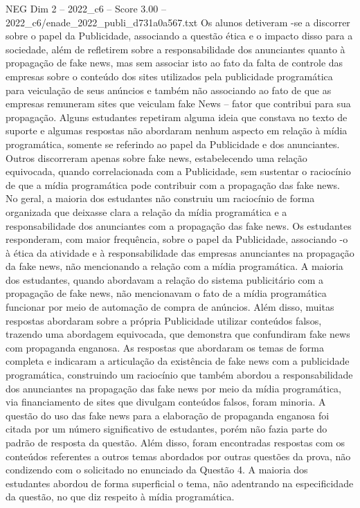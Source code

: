 \begin{textsample}{NEG Dim 2 – 2022\_c6 – Score 3.00 – 2022\_c6/enade\_2022\_publi\_d731a0a567.txt}
Os alunos detiveram -se a discorrer sobre o papel da Publicidade, associando a questão ética e o impacto disso para a sociedade, além de refletirem sobre a responsabilidade dos anunciantes quanto à propagação de fake news, mas sem associar isto ao fato da falta de controle das empresas sobre o conteúdo dos sites utilizados pela publicidade programática para veiculação de seus anúncios e também não associando ao fato de que as empresas remuneram sites que veiculam fake News – fator que contribui para sua propagação.
Alguns estudantes repetiram alguma ideia que constava no texto de suporte e algumas respostas não abordaram nenhum aspecto em relação à mídia programática, somente se referindo ao papel da Publicidade e dos anunciantes.
Outros discorreram apenas sobre fake news, estabelecendo uma relação equivocada, quando correlacionada com a Publicidade, sem sustentar o raciocínio de que a mídia programática pode contribuir com a propagação das fake news.
No geral, a maioria dos estudantes não construiu um raciocínio de forma organizada que deixasse clara a relação da mídia programática e a responsabilidade dos anunciantes com a propagação das fake news.
Os estudantes responderam, com maior frequência, sobre o papel da Publicidade, associando -o à ética da atividade e à responsabilidade das empresas anunciantes na propagação da fake news, não mencionando a relação com a mídia programática.
A maioria dos estudantes, quando abordavam a relação do sistema publicitário com a propagação de fake news, não mencionavam o fato de a mídia programática funcionar por meio de automação de compra de anúncios.
Além disso, muitas respostas abordaram sobre a própria Publicidade utilizar conteúdos falsos, trazendo uma abordagem equivocada, que demonstra que confundiram fake news com propaganda enganosa.
As respostas que abordaram os temas de forma completa e indicaram a articulação da existência de fake news com a publicidade programática, construindo um raciocínio que também abordou a responsabilidade dos anunciantes na propagação das fake news por meio da mídia programática, via financiamento de sites que divulgam conteúdos falsos, foram minoria.
A questão do uso das fake news para a elaboração de propaganda enganosa foi citada por um número significativo de estudantes, porém não fazia parte do padrão de resposta da questão.
Além disso, foram encontradas respostas com os conteúdos referentes a outros temas abordados por outras questões da prova, não condizendo com o solicitado no enunciado da Questão 4.
A maioria dos estudantes abordou de forma superficial o tema, não adentrando na especificidade da questão, no que diz respeito à mídia programática.

\end{textsample}
